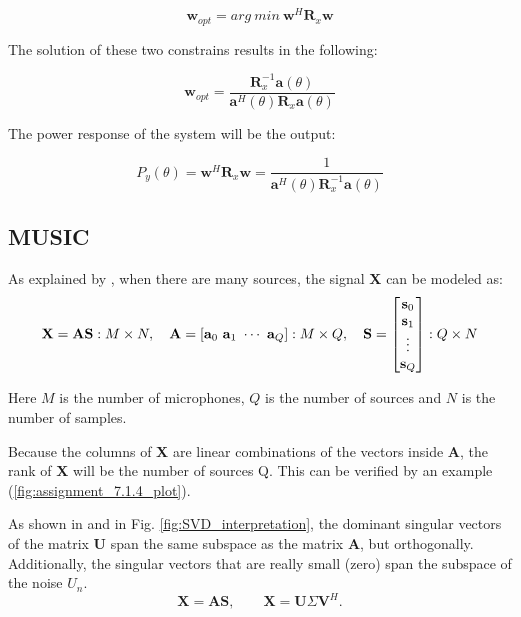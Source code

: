 \begin{equation}
\textbf{w}_{opt}=arg\: min\:\textbf{w}^\textit{H}\textbf{R}_x\textbf{w}
\end{equation}


\noindent The solution of these two constrains results in the following:

\begin{equation}
\textbf{w}_{opt}=\frac{\textbf{R}_x^{-1}\textbf{a}(\theta)}{\textbf{a}^\textit{H}(\theta)\textbf{R}_x\textbf{a}(\theta)}
\end{equation}
\label{MVDR_beamformer}

\noindent The power response of the system will be the output:

\begin{equation}
    P_y(\theta)=\textbf{w}^\textit{H}\textbf{R}_x\textbf{w}=\frac{1}{\textbf{a}^\textit{H}(\theta)\textbf{R}_x^{-1}\textbf{a}(\theta)}
\end{equation}

\subsection{MUSIC}
As explained by \cite{IP3Man}, when there are many sources, the signal \textbf{X} can be modeled as:
\begin{equation}
\mathbf{X} = \mathbf{A}\mathbf{S} : M \times N, \quad
\mathbf{A} = [\mathbf{a}_0 \ \mathbf{a}_1 \ \cdots \ \mathbf{a}_Q] : M \times Q, \quad
\mathbf{S} = \begin{bmatrix} 
\mathbf{s}_0 \\ 
\mathbf{s}_1 \\ 
\vdots \\ 
\mathbf{s}_Q 
\end{bmatrix} : Q \times N \\
\end{equation}

Here $M$ is the number of microphones, $Q$ is the number of sources and $N$ is the number of samples.




Because the columns of \textbf{X} are linear combinations of the vectors inside \textbf{A}, the rank of \textbf{X} will be the number of sources Q. This can be verified by an example (\ref{fig:assignment_7.1.4_plot}).

As shown in \cite{IP3Man} and in Fig. \ref{fig:SVD_interpretation}, the dominant singular vectors of the matrix \textbf{U} span the same subspace as the matrix \textbf{A}, but orthogonally. Additionally, the singular vectors that are really small (zero) span the subspace of the noise \textbf{$U_n$}.
$$
\mathbf{X} = \mathbf{A}\mathbf{S}, \qquad \mathbf{X} = \mathbf{U}\Sigma\mathbf{V}^H.
$$

